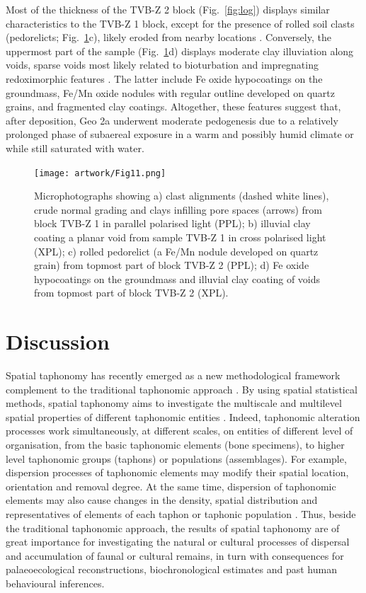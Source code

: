 \documentclass[review,times,authoryear]{elsarticle} %
\begin{document}
Most of the thickness of the TVB-Z 2 block (Fig.~\ref{fig:log}) displays similar characteristics to the TVB-Z 1 block, except for the presence of rolled soil clasts (pedorelicts; Fig.~\ref{fig:micro}c), likely eroded from nearby locations \citep{Cremaschi2018}. Conversely, the uppermost part of the sample (Fig.~\ref{fig:micro}d) displays moderate clay illuviation along voids, sparse voids most likely related to bioturbation and impregnating redoximorphic features \citep{Lindbo2010}. The latter include Fe oxide hypocoatings on the groundmass, Fe/Mn oxide nodules with regular outline developed on quartz grains, and fragmented clay coatings. Altogether, these features suggest that, after deposition, Geo 2a underwent moderate pedogenesis due to a relatively prolonged phase of subaereal exposure in a warm and possibly humid climate or while still saturated with water.

\begin{figure}
  \centering
  \texttt{[image: artwork/Fig11.png]}
  \caption{Microphotographs showing a) clast alignments (dashed white lines), crude normal grading and clays infilling pore spaces (arrows) from block TVB-Z 1 in parallel polarised light (PPL); b) illuvial clay coating a planar void from sample TVB-Z 1 in cross polarised light (XPL); c) rolled pedorelict (a Fe/Mn nodule developed on quartz grain) from topmost part of block TVB-Z 2 (PPL); d) Fe oxide hypocoatings on the groundmass and illuvial clay coating of voids from topmost part of block TVB-Z 2 (XPL).}
  \label{fig:micro}
\end{figure}

\section{Discussion}

Spatial taphonomy has recently emerged as a new methodological framework complement to the traditional taphonomic approach \citep{Dominguez-Rodrigo2017}. By using spatial statistical methods, spatial taphonomy aims to investigate the multiscale and multilevel spatial properties of different taphonomic entities \citep[\emph{sensu}][]{Fernandez-Lopez2006}. Indeed, taphonomic alteration processes work simultaneously, at different scales, on entities of different level of organisation, from the basic taphonomic elements (bone specimens), to higher level taphonomic groups (taphons) or populations (assemblages). For example, dispersion processes of taphonomic elements may modify their spatial location, orientation and removal degree. At the same time, dispersion of taphonomic elements may also cause changes in the density, spatial distribution and representatives of elements of each taphon or taphonic population \citep{Fernandez-Lopez2006}. Thus, beside the traditional taphonomic approach, the results of spatial taphonomy are of great importance for investigating the natural or cultural processes of dispersal and accumulation of faunal or cultural remains, in turn with consequences for palaeoecological reconstructions, biochronological estimates and past human behavioural inferences.
\end{document}
